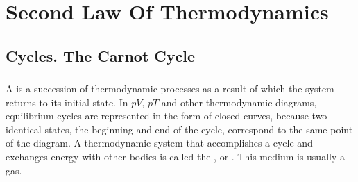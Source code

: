 
\chapter{Second Law Of Thermodynamics}
\label{ch-11}


\section{Cycles. The Carnot Cycle}
\label{sec-11.1}

\subsection{}\label{11.1.1}A  is a succession of thermodynamic processes  as a result of which the system returns to its initial state. In $pV$, $pT$ and other thermodynamic diagrams, equilibrium cycles  are represented in the form of closed curves, because two identical states, the beginning and end of the cycle, correspond to the same point of the diagram. A thermodynamic system that accomplishes a cycle and exchanges energy with other bodies is called the , or . This medium is usually a gas.

